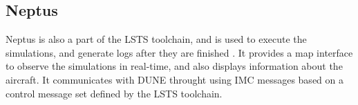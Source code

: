 \subsection{Neptus}

Neptus is also a part of the LSTS toolchain, and is used to execute the simulations, and generate logs after they are finished \cite{NEPTUS}. It provides a map interface to observe the simulations in real-time, and also displays information about the aircraft. It communicates with DUNE throught using IMC messages based on a control message set defined by the LSTS toolchain.